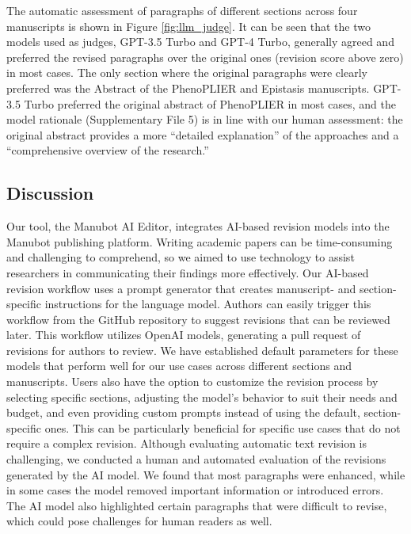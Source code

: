 \documentclass[
]{article}
\begin{document}
The automatic assessment of paragraphs of different sections across four manuscripts is shown in Figure \ref{fig:llm_judge}.
It can be seen that the two models used as judges, GPT-3.5 Turbo and GPT-4 Turbo, generally agreed and preferred the revised paragraphs over the original ones (revision score above zero) in most cases.
The only section where the original paragraphs were clearly preferred was the Abstract of the PhenoPLIER and Epistasis manuscripts.
GPT-3.5 Turbo preferred the original abstract of PhenoPLIER in most cases, and the model rationale (Supplementary File 5) is in line with our human assessment: the original abstract provides a more ``detailed explanation'' of the approaches and a ``comprehensive overview of the research.''

\subsection{Discussion}

Our tool, the Manubot AI Editor, integrates AI-based revision models into the Manubot publishing platform.
Writing academic papers can be time-consuming and challenging to comprehend, so we aimed to use technology to assist researchers in communicating their findings more effectively.
Our AI-based revision workflow uses a prompt generator that creates manuscript- and section-specific instructions for the language model.
Authors can easily trigger this workflow from the GitHub repository to suggest revisions that can be reviewed later.
This workflow utilizes OpenAI models, generating a pull request of revisions for authors to review.
We have established default parameters for these models that perform well for our use cases across different sections and manuscripts.
Users also have the option to customize the revision process by selecting specific sections, adjusting the model's behavior to suit their needs and budget, and even providing custom prompts instead of using the default, section-specific ones.
This can be particularly beneficial for specific use cases that do not require a complex revision.
Although evaluating automatic text revision is challenging, we conducted a human and automated evaluation of the revisions generated by the AI model.
We found that most paragraphs were enhanced, while in some cases the model removed important information or introduced errors.
The AI model also highlighted certain paragraphs that were difficult to revise, which could pose challenges for human readers as well.
\end{document}
